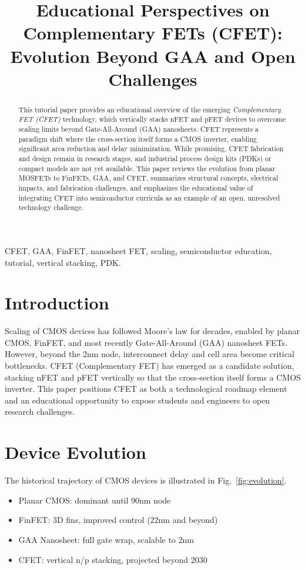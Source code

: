 \documentclass[conference]{IEEEtran}
\title{Educational Perspectives on Complementary FETs (CFET): \\
Evolution Beyond GAA and Open Challenges}
\author{
\IEEEauthorblockN{Shinichi Samizo}
\IEEEauthorblockA{
Project Design Hub, Samizo-AITL \\
Email: samizo-aitl@example.com
}
}
\begin{document}
\maketitle

\begin{abstract}
This tutorial paper provides an educational overview of the emerging
\textit{Complementary FET (CFET)} technology, which vertically stacks
nFET and pFET devices to overcome scaling limits beyond Gate-All-Around
(GAA) nanosheets. CFET represents a paradigm shift where the
cross-section itself forms a CMOS inverter, enabling significant area
reduction and delay minimization. While promising, CFET fabrication and
design remain in research stages, and industrial process design kits
(PDKs) or compact models are not yet available. This paper reviews the
evolution from planar MOSFETs to FinFETs, GAA, and CFET, summarizes
structural concepts, electrical impacts, and fabrication challenges, and
emphasizes the educational value of integrating CFET into semiconductor
curricula as an example of an open, unresolved technology challenge.
\end{abstract}

\begin{IEEEkeywords}
CFET, GAA, FinFET, nanosheet FET, scaling, semiconductor education,
tutorial, vertical stacking, PDK.
\end{IEEEkeywords}

\section{Introduction}
Scaling of CMOS devices has followed Moore's law for decades, enabled
by planar CMOS, FinFET, and most recently Gate-All-Around (GAA)
nanosheet FETs. However, beyond the 2nm node, interconnect delay and
cell area become critical bottlenecks. CFET (Complementary FET) has
emerged as a candidate solution, stacking nFET and pFET vertically so
that the cross-section itself forms a CMOS inverter. This paper
positions CFET as both a technological roadmap element and an
educational opportunity to expose students and engineers to open
research challenges.

\section{Device Evolution}
The historical trajectory of CMOS devices is illustrated in
Fig.~\ref{fig:evolution}.
\begin{itemize}
\item Planar CMOS: dominant until 90nm node
\item FinFET: 3D fins, improved control (22nm and beyond)
\item GAA Nanosheet: full gate wrap, scalable to 2nm
\item CFET: vertical n/p stacking, projected beyond 2030
\end{itemize}
\end{document}
